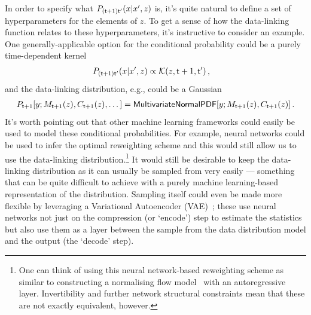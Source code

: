 In order to specify what $P_{({\sf t}+1){\sf t}'}(x\vert x',z)$ is, it's quite natural to define a set of hyperparameters for the elements of $z$. To get a sense of how the data-linking function relates to these hyperparameters, it's instructive to consider an example. One generally-applicable option for the conditional probability could be a purely time-dependent kernel
\begin{align}
P_{({\sf t}+1){\sf t}'}(x\vert x',z) &\propto {\cal K}(z, {\sf t}+1,{\sf t}')  \label{eq:time-dependent-kernel} \,, 
\end{align}
and the data-linking distribution, e.g., could be a Gaussian
\begin{align}
P_{{\sf t}+1}[y;M_{{\sf t}+1}(z),C_{{\sf t}+1}(z),\dots ] = {\sf MultivariateNormalPDF}[y;M_{{\sf t}+1}(z),C_{{\sf t}+1}(z)] \label{eq:gaussian-data-prob}\,.
\end{align}
It's worth pointing out that other machine learning frameworks could easily be used to model these conditional probabilities. For example, neural networks could be used to infer the optimal reweighting scheme and this would still allow us to use the data-linking distribution.\footnote{One can think of using this neural network-based reweighting scheme as similar to constructing a normalising flow model~\cite{kobyzev2020normalizing} with an autoregressive layer. Invertibility and further network structural constraints mean that these are not exactly equivalent, however.} It would still be desirable to keep the data-linking distribution as it can usually be sampled from very easily --- something that can be quite difficult to achieve with a purely machine learning-based representation of the distribution. Sampling itself could even be made more flexible by leveraging a Variational Autoencoder (VAE)~\cite{pinheiro2021variational}; these use neural networks not just on the compression (or `encode') step to estimate the statistics but also use them as a layer between the sample from the data distribution model and the output (the `decode' step).

